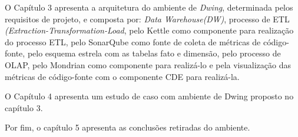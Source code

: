O Capítulo 3 apresenta a arquitetura do ambiente de \textit{Dwing}, determinada pelos 
requisitos de projeto, e composta por: \textit{Data Warehouse(DW)},  processo de ETL \textit{(Extraction-Transformation-Load}, pelo Kettle como 
componente para realização do processo ETL, pelo SonarQube como fonte de coleta de métricas de 
código-fonte, pelo esquema estrela com as tabelas fato e dimensão, pelo processo de 
OLAP, pelo Mondrian como componente para realizá-lo e pela visualização das métricas 
de código-fonte com o componente CDE para realizá-la.

 
O Capítulo 4 apresenta um estudo de caso com ambiente de Dwing proposto no 
capítulo 3. 

Por fim, o capítulo 5 apresenta as conclusões retiradas do ambiente.

